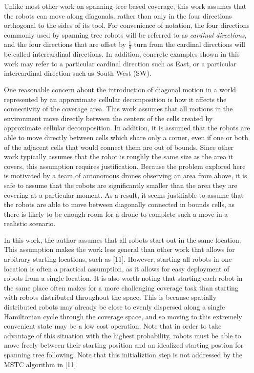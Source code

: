 
Unlike most other work on spanning-tree based coverage, this work assumes that the robots can move along diagonals, rather than only in the four directions orthogonal to the sides of its tool. For convenience of notation, the four directions commonly used by spanning tree robots will be referred to as \textit{cardinal directions}, and the four directions that are offset by $\frac{1}{8}$ turn from the cardinal directions will be called intercardinal directions. In addition, concrete examples shown in this work may refer to a particular cardinal direction such as East, or a particular intercardinal direction such as South-West (SW).

One reasonable concern about the introduction of diagonal motion in a world represented by an approximate cellular decomposition is how it affects the connectivity of the coverage area. This work assumes that all motions in the environment move directly between the centers of the cells created by approximate cellular decomposition. In addition, it is assumed that the robots are able to move directly between cells which share only a corner, even if one or both of the adjacent cells that would connect them are out of bounds. Since other work typically assumes that the robot is roughly the same size as the area it covers, this assumption requires justification. Because the problem explored here is motivated by a team of autonomous drones observing an area from above, it is safe to assume that the robots are significantly smaller than the area they are covering at a particular moment. As a result, it seems justifiable to assume that the robots are able to move between diagonally connected in bounds cells, as there is likely to be enough room for a drone to complete such a move in a realistic scenario.


In this work, the author assumes that all robots start out in the same location. This assumption makes the work less general than other work that allows for arbitrary starting locations, such as [11]. However, starting all robots in one location is often a practical assumption, as it allows for easy deployment of robots from a single location. It is also worth noting that starting each robot in the same place often makes for a more challenging coverage task than starting with robots distributed throughout the space. This is because spatially distributed robots may already be close to evenly dispersed along a single Hamiltonian cycle through the coverage space, and so moving to this extremely convenient state may be a low cost operation. Note that in order to take advantage of this situation with the highest probability, robots must be able to move freely between their starting position and an idealized starting postion for spanning tree following. Note that this initializtion step is not addressed by the MSTC algorithm in [11].

